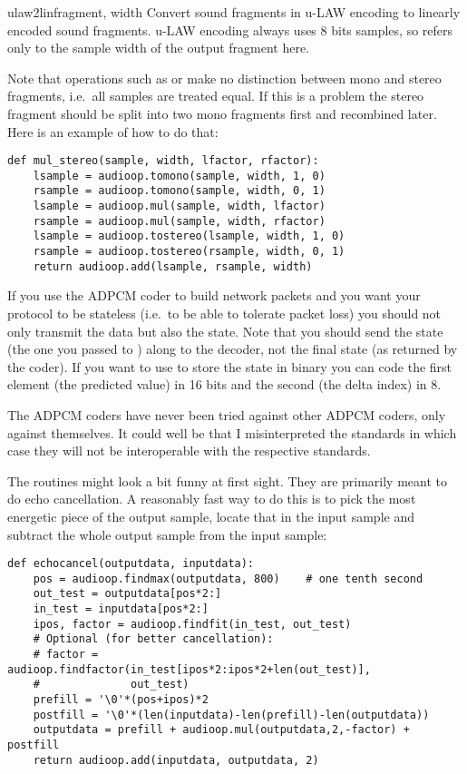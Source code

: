 \begin{funcdesc}{ulaw2lin}{fragment, width}
Convert sound fragments in u-LAW encoding to linearly encoded sound
fragments.  u-LAW encoding always uses 8 bits samples, so 
refers only to the sample width of the output fragment here.
\end{funcdesc}

Note that operations such as  or  make
no distinction between mono and stereo fragments, i.e.\ all samples
are treated equal.  If this is a problem the stereo fragment should be
split into two mono fragments first and recombined later.  Here is an
example of how to do that:

\begin{verbatim}
def mul_stereo(sample, width, lfactor, rfactor):
    lsample = audioop.tomono(sample, width, 1, 0)
    rsample = audioop.tomono(sample, width, 0, 1)
    lsample = audioop.mul(sample, width, lfactor)
    rsample = audioop.mul(sample, width, rfactor)
    lsample = audioop.tostereo(lsample, width, 1, 0)
    rsample = audioop.tostereo(rsample, width, 0, 1)
    return audioop.add(lsample, rsample, width)
\end{verbatim}

If you use the ADPCM coder to build network packets and you want your
protocol to be stateless (i.e.\ to be able to tolerate packet loss)
you should not only transmit the data but also the state.  Note that
you should send the  state (the one you passed to
) along to the decoder, not the final state (as
returned by the coder).  If you want to use 
to store the state in binary you can code the first element (the
predicted value) in 16 bits and the second (the delta index) in 8.

The ADPCM coders have never been tried against other ADPCM coders,
only against themselves.  It could well be that I misinterpreted the
standards in which case they will not be interoperable with the
respective standards.

The  routines might look a bit funny at first sight.
They are primarily meant to do echo cancellation.  A reasonably
fast way to do this is to pick the most energetic piece of the output
sample, locate that in the input sample and subtract the whole output
sample from the input sample:

\begin{verbatim}
def echocancel(outputdata, inputdata):
    pos = audioop.findmax(outputdata, 800)    # one tenth second
    out_test = outputdata[pos*2:]
    in_test = inputdata[pos*2:]
    ipos, factor = audioop.findfit(in_test, out_test)
    # Optional (for better cancellation):
    # factor = audioop.findfactor(in_test[ipos*2:ipos*2+len(out_test)], 
    #              out_test)
    prefill = '\0'*(pos+ipos)*2
    postfill = '\0'*(len(inputdata)-len(prefill)-len(outputdata))
    outputdata = prefill + audioop.mul(outputdata,2,-factor) + postfill
    return audioop.add(inputdata, outputdata, 2)
\end{verbatim}
